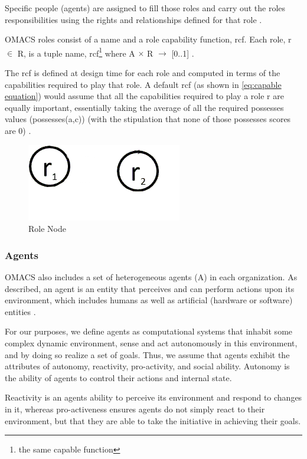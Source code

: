 Specific people (agents) are assigned to fill those roles and carry out the roles responsibilities using the rights and
relationships defined for that role \cite{omacs2}.

OMACS roles consist of a name and a role capability function, rcf. Each role, r $\in$ R, is a tuple
\textlangle{} name, rcf\footnote{the same capable function} \textrangle{} where A $\times$ R $\rightarrow$ {[}0..1{]} .


The rcf is defined at design time for each role and computed in terms of 
the capabilities required to play that role.
A default rcf (as shown in \ref{eq:capable equation}) 
would assume that all the capabilities required to play a role r are equally important,
essentially taking the average of all the required possesses values (possesses(a,c))
(with the stipulation that none of those possesses scores are 0) \cite{omacs4}.
\hspace{1.5cm}
\begin{figure}[th]
	\centering
		\includegraphics[scale=0.5]{ch1/img/roles}
	\caption{\label{fig:Role Node}Role Node}
\end{figure}
\hspace{1cm}
\subsubsection{Agents}

OMACS also includes a set of heterogeneous agents (A) in each organization. 
As described, an agent is an entity that perceives and can perform actions upon its
environment, which includes humans as well as artificial (hardware or software) entities \cite{omacs2}.

For our purposes, we define agents as computational systems that inhabit some complex dynamic
environment, sense and act autonomously in this environment, and by doing so realize a set of
goals. Thus, we assume that agents exhibit the attributes of autonomy, reactivity, pro-activity, and
social ability. Autonomy is the ability of agents to control their actions and internal state.


Reactivity is an agents ability to perceive its environment and respond to changes in it, whereas
pro-activeness ensures agents do not simply react to their environment, but that they are able to
take the initiative in achieving their goals. 

